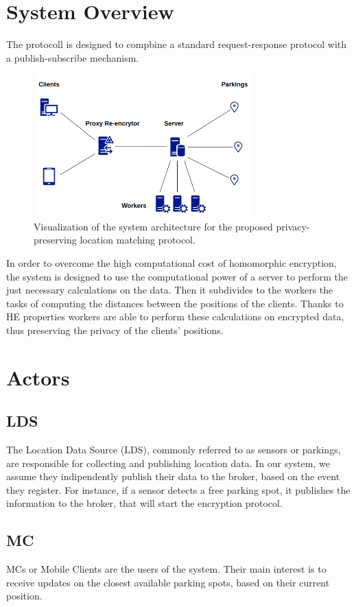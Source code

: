 \documentclass[12pt,a4paper,twoside]{book}
\begin{document}
\section{System Overview}
The protocoll is designed to compbine a standard request-response protocol with a publish-subscribe mechanism.


\begin{figure}[h]
    \centering
    \includegraphics[width=8.5cm,height=5.5cm]{img/architecture-scheme.png}
    \caption{Visualization of the system architecture for the proposed privacy-preserving location matching protocol.}
    \label{fig:architecture}
\end{figure}

In order to overcome the high computational cost of homomorphic encryption, the system is designed to use the computational power of a server to perform the just necessary calculations on the data. Then it subdivides to the workers the tasks of computing the distances between the positions of the clients. Thanks to HE properties workers are able to perform these calculations on encrypted data, thus preserving the privacy of the clients' positions. 

\section{Actors}

\subsection{LDS}
The Location Data Source (LDS), commonly referred to as sensors or parkings, are responsible for collecting and publishing location data. In our system, we assume they indipendently publish their data to the broker, based on the event they register. For instance, if a sensor detects a free parking spot, it publishes the information to the broker, that will start the encryption protocol.

\subsection{MC}
MCs or Mobile Clients are the users of the system. Their main interest is to receive updates on the closest available parking spots, based on their current position. 
\end{document}
